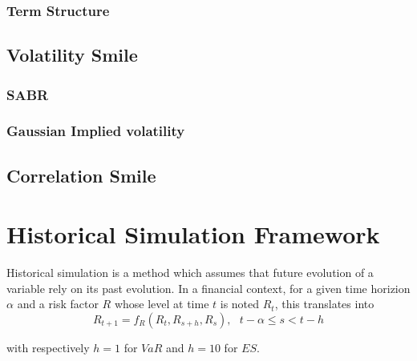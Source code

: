 \documentclass[3pt]{article}
\begin{document}
\subsubsection{Term Structure}

\subsection{Volatility Smile}

\bigskip

\subsubsection{SABR}

\subsubsection{Gaussian Implied volatility}

\bigskip

\subsection{Correlation Smile}

\bigskip 

\bigskip 

\bigskip 

\bigskip 

\bigskip 

\bigskip 

\bigskip 

\bigskip

\bigskip 

\bigskip 

\bigskip 

\bigskip 

\section{Historical Simulation Framework}

Historical simulation is a method which assumes that future evolution of a
variable rely on its past evolution. In a financial context, for a given
time horizion $\alpha $ and a risk factor $R$ whose level at time $t$ is
noted $R_{t}$, this translates into 
\begin{equation*}
R_{t+1}=f_{R}(R_{t},R_{s+h},R_{s}),\text{ \ \ }t-\alpha \leq s<t-h
\end{equation*}

with respectively $h=1$ for $VaR$ and $h=10$ for $ES$.
\end{document}
